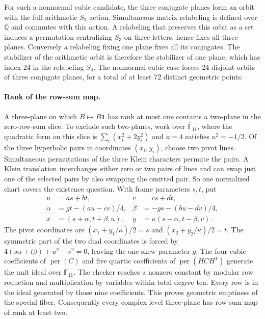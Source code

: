 For such a nonnormal cubic candidate, the three conjugate planes
form an orbit with the full arithmetic \(S_3\) action. Simultaneous
matrix relabeling is defined over \(\mathbb Q\) and commutes with
this action. A relabeling that preserves this orbit as a set induces
a permutation centralizing \(S_3\) on three letters, hence fixes all
three planes. Conversely a relabeling fixing one plane fixes all its
conjugates. The stabilizer of the arithmetic orbit is therefore the
stabilizer of one plane, which has index 24 in the relabeling
\(S_4\). The nonnormal cubic case forces 24 disjoint orbits of three
conjugate planes, for a total of at least 72 distinct geometric points.

\paragraph{Rank of the row-sum map.}
A three-plane on which \(B\mapsto B\mathbf1\) has rank at most one
contains a two-plane in the zero-row-sum slice. To exclude such
two-planes, work over \(\overline{\mathbb F}_{11}\), where the quadratic
form on this slice is \(\sum_i(x_i^2+2y_i^2)\) and \(\kappa=4\)
satisfies \(\kappa^2=-1/2\). Of the three hyperbolic pairs in
coordinates \((x_i,y_i)\), choose two pivot lines. Simultaneous
permutations of the three Klein characters permute the pairs.
A Klein translation interchanges either zero or two pairs of lines
and can swap just one of the selected pairs by also swapping the
omitted pair. So one normalized chart covers the existence question.
With frame parameters \(s,t\), put
\begin{align*}
 u&=as+bt,& v&=cs+dt,\\
 \alpha&=gt-(au-cv)/4,& \beta&=-gs-(bu-dv)/4,\\
 x&=(s+\alpha,t+\beta,u),& y&=\kappa(s-\alpha,t-\beta,v).
\end{align*}
The pivot coordinates are \((x_1+y_1/\kappa)/2=s\) and
\((x_2+y_2/\kappa)/2=t\). The symmetric part of the two dual
coordinates is forced by \(4(s\alpha+t\beta)+u^2-v^2=0\), leaving the
one skew parameter \(g\).
The four cubic coefficients of \(\operatorname{per}(C)\) and five
quartic coefficients of \(\operatorname{per}(HCH^T)\) generate the unit
ideal over \(\mathbb F_{11}\). The checker reaches a nonzero constant by
modular row reduction and multiplication by variables within total degree
ten. Every row is in the ideal generated by those nine coefficients.
This proves geometric emptiness of the special fiber. Consequently every
complex level three-plane has row-sum map of rank at least two.

